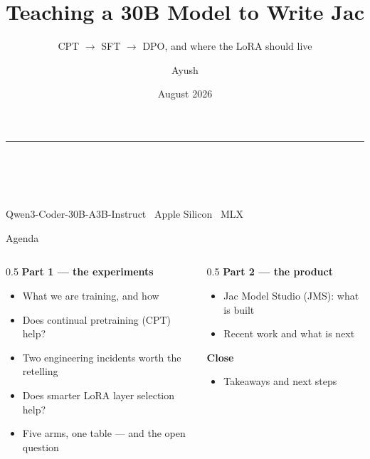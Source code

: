 \documentclass[aspectratio=169,11pt]{beamer}
\title[Jac fine-tuning: CPT, SFT, DPO \& layer selection]{Teaching a 30B Model to Write Jac}
\subtitle{CPT $\rightarrow$ SFT $\rightarrow$ DPO, and where the LoRA should live}
\author{Ayush}
\institute{Jaseci Labs}
\date{August 2026}
\begin{document}
\begin{frame}[plain]
  \vfill
  \begin{center}
    {\color{jsPrimary}\rule{0.16\textwidth}{2pt}}\\[1.2em]
    {\color{jsPrimary}\inserttitle}\\[0.5em]
    {\large\color{jsInk}\insertsubtitle}\\[1.8em]
    {\color{jsMute}\insertauthor\ \textperiodcentered\ \insertinstitute\ \textperiodcentered\ \insertdate}\\[1.2em]
    {\footnotesize\color{jsMute}Qwen3-Coder-30B-A3B-Instruct \textperiodcentered\ Apple Silicon \textperiodcentered\ MLX}
  \end{center}
  \vfill
\end{frame}

\begin{frame}{Agenda}
  \vspace{0.5em}
  \begin{columns}[T]
    \begin{column}{0.5\textwidth}
      \textbf{\color{jsPrimary}Part 1 --- the experiments}
      \begin{itemize}
        \item What we are training, and how
        \item Does continual pretraining (CPT) help?
        \item Two engineering incidents worth the retelling
        \item Does smarter LoRA layer selection help?
        \item Five arms, one table --- and the open question
      \end{itemize}
    \end{column}
    \begin{column}{0.5\textwidth}
      \textbf{\color{jsPrimary}Part 2 --- the product}
      \begin{itemize}
        \item Jac Model Studio (JMS): what is built
        \item Recent work and what is next
      \end{itemize}
      \vspace{1.2em}
      \textbf{\color{jsPrimary}Close}
      \begin{itemize}
        \item Takeaways and next steps
      \end{itemize}
    \end{column}
  \end{columns}
\end{frame}
\end{document}
